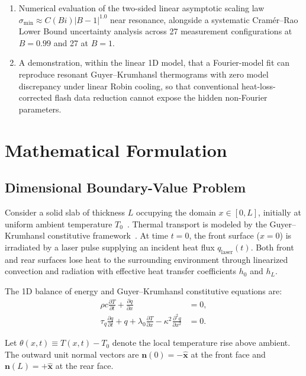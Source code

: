 \documentclass[preprint,12pt]{elsarticle}
\begin{document}
\begin{enumerate}
    \item Numerical evaluation of the two-sided linear asymptotic scaling law $\sigma_{\min} \approx C(Bi) |B - 1|^{1.0}$ near resonance, alongside a systematic Cramér--Rao Lower Bound uncertainty analysis across 27 measurement configurations at $B = 0.99$ and 27 at $B = 1$.
    \item A demonstration, within the linear 1D model, that a Fourier-model fit can reproduce resonant Guyer--Krumhansl thermograms with zero model discrepancy under linear Robin cooling, so that conventional heat-loss-corrected flash data reduction cannot expose the hidden non-Fourier parameters.
\end{enumerate}

\section{Mathematical Formulation}

\subsection{Dimensional Boundary-Value Problem}

Consider a solid slab of thickness $L$ occupying the domain $x \in [0, L]$, initially at uniform ambient temperature $T_0$~\cite{carslaw1959conduction,ozisik1993heat}. Thermal transport is modeled by the Guyer--Krumhansl constitutive framework~\cite{guyer1966solution,guyer1966thermal,sellitto2016mesoscopic,cimmelli2009different}. At time $t = 0$, the front surface ($x = 0$) is irradiated by a laser pulse supplying an incident heat flux $q_{\mathrm{laser}}(t)$. Both front and rear surfaces lose heat to the surrounding environment through linearized convection and radiation with effective heat transfer coefficients $h_0$ and $h_L$.

The 1D balance of energy and Guyer--Krumhansl constitutive equations are:
\begin{align}
\rho c \frac{\partial T}{\partial t} + \frac{\partial q}{\partial x} &= 0, \label{eq:energy_balance} \\
\tau_q \frac{\partial q}{\partial t} + q + \lambda_0 \frac{\partial T}{\partial x} - \kappa^2 \frac{\partial^2 q}{\partial x^2} &= 0. \label{eq:gk_flux}
\end{align}

Let $\theta(x, t) \equiv T(x, t) - T_0$ denote the local temperature rise above ambient. The outward unit normal vectors are $\bm{n}(0) = -\hat{\bm{x}}$ at the front face and $\bm{n}(L) = +\hat{\bm{x}}$ at the rear face.
\end{document}
